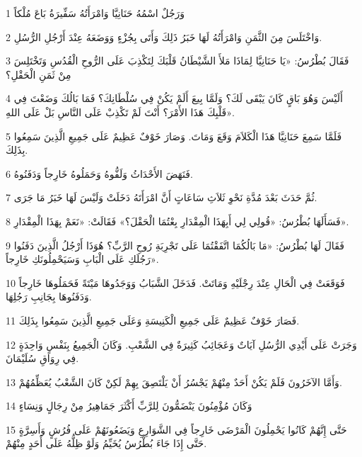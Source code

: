 \par 1 وَرَجُلٌ اسْمُهُ حَنَانِيَّا وَامْرَأَتُهُ سَفِّيرَةُ بَاعَ مُلْكاً
\par 2 وَاخْتَلَسَ مِنَ الثَّمَنِ وَامْرَأَتُهُ لَهَا خَبَرُ ذَلِكَ وَأَتَى بِجُزْءٍ وَوَضَعَهُ عِنْدَ أَرْجُلِ الرُّسُلِ.
\par 3 فَقَالَ بُطْرُسُ: «يَا حَنَانِيَّا لِمَاذَا مَلأَ الشَّيْطَانُ قَلْبَكَ لِتَكْذِبَ عَلَى الرُّوحِ الْقُدُسِ وَتَخْتَلِسَ مِنْ ثَمَنِ الْحَقْلِ؟
\par 4 أَلَيْسَ وَهُوَ بَاقٍ كَانَ يَبْقَى لَكَ؟ وَلَمَّا بِيعَ أَلَمْ يَكُنْ فِي سُلْطَانِكَ؟ فَمَا بَالُكَ وَضَعْتَ فِي قَلْبِكَ هَذَا الأَمْرَ؟ أَنْتَ لَمْ تَكْذِبْ عَلَى النَّاسِ بَلْ عَلَى اللهِ».
\par 5 فَلَمَّا سَمِعَ حَنَانِيَّا هَذَا الْكَلاَمَ وَقَعَ وَمَاتَ. وَصَارَ خَوْفٌ عَظِيمٌ عَلَى جَمِيعِ الَّذِينَ سَمِعُوا بِذَلِكَ.
\par 6 فَنَهَضَ الأَحْدَاثُ وَلَفُّوهُ وَحَمَلُوهُ خَارِجاً وَدَفَنُوهُ.
\par 7 ثُمَّ حَدَثَ بَعْدَ مُدَّةِ نَحْوِ ثَلاَثِ سَاعَاتٍ أَنَّ امْرَأَتَهُ دَخَلَتْ وَلَيْسَ لَهَا خَبَرُ مَا جَرَى.
\par 8 فَسَأَلَهَا بُطْرُسُ: «قُولِي لِي أَبِهَذَا الْمِقْدَارِ بِعْتُمَا الْحَقْلَ؟» فَقَالَتْ: «نَعَمْ بِهَذَا الْمِقْدَارِ».
\par 9 فَقَالَ لَهَا بُطْرُسُ: «مَا بَالُكُمَا اتَّفَقْتُمَا عَلَى تَجْرِبَةِ رُوحِ الرَّبِّ؟ هُوَذَا أَرْجُلُ الَّذِينَ دَفَنُوا رَجُلَكِ عَلَى الْبَابِ وَسَيَحْمِلُونَكِ خَارِجاً».
\par 10 فَوَقَعَتْ فِي الْحَالِ عِنْدَ رِجْلَيْهِ وَمَاتَتْ. فَدَخَلَ الشَّبَابُ وَوَجَدُوهَا مَيْتَةً فَحَمَلُوهَا خَارِجاً وَدَفَنُوهَا بِجَانِبِ رَجُلِهَا.
\par 11 فَصَارَ خَوْفٌ عَظِيمٌ عَلَى جَمِيعِ الْكَنِيسَةِ وَعَلَى جَمِيعِ الَّذِينَ سَمِعُوا بِذَلِكَ.
\par 12 وَجَرَتْ عَلَى أَيْدِي الرُّسُلِ آيَاتٌ وَعَجَائِبُ كَثِيرَةٌ فِي الشَّعْبِ. وَكَانَ الْجَمِيعُ بِنَفْسٍ وَاحِدَةٍ فِي رِوَاقِ سُلَيْمَانَ.
\par 13 وَأَمَّا الآخَرُونَ فَلَمْ يَكُنْ أَحَدٌ مِنْهُمْ يَجْسُرُ أَنْ يَلْتَصِقَ بِهِمْ لَكِنْ كَانَ الشَّعْبُ يُعَظِّمُهُمْ.
\par 14 وَكَانَ مُؤْمِنُونَ يَنْضَمُّونَ لِلرَّبِّ أَكْثَرَ جَمَاهِيرُ مِنْ رِجَالٍ وَنِسَاءٍ
\par 15 حَتَّى إِنَّهُمْ كَانُوا يَحْمِلُونَ الْمَرْضَى خَارِجاً فِي الشَّوَارِعِ وَيَضَعُونَهُمْ عَلَى فُرُشٍ وَأَسِرَّةٍ حَتَّى إِذَا جَاءَ بُطْرُسُ يُخَيِّمُ وَلَوْ ظِلُّهُ عَلَى أَحَدٍ مِنْهُمْ.

